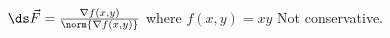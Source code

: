 {$\ds\vec{F} = \frac{ \nabla f(x,y) }{\norm{\nabla f(x,y)}}$ where $f(x,y)=xy$
}
{Not conservative.}
